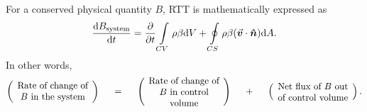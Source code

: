 \documentclass[12pt, a4paper]{article}
\numberwithin{equation}{subsection}
\begin{document}
For a conserved physical quantity $B$, RTT is mathematically expressed as
\begin{equation}
\label{eqn:RTT}
    \frac{\mathrm{d}B_{\rm system}}{\mathrm{d}t} 
    = \frac{\partial}{\partial t} \int\limits_{CV} \rho \beta \mathrm{d}V 
    + \oint\limits_{CS} \rho \beta (\vec{\bm{v}} \cdot \bm{\hat{n}})\mathrm{d}A.
\end{equation}
In other words,
\begin{equation*}
\begin{pmatrix}
\begin{minipage}{3cm}
{\begin{center}Rate of change of $B$ in the system\end{center}}
\end{minipage}
\end{pmatrix}
\hspace{0.5cm}=\hspace{0.5cm}
\begin{pmatrix}
\begin{minipage}{3cm}
{\begin{center}Rate of change of $B$ in control volume\end{center}}
\end{minipage}
\end{pmatrix}
\hspace{0.5cm}+\hspace{0.5cm}
\begin{pmatrix}
\begin{minipage}{3cm}
{\begin{center}Net flux of $B$ out of control volume\end{center}}
\end{minipage}
\end{pmatrix}.
\end{equation*}
\end{document}

